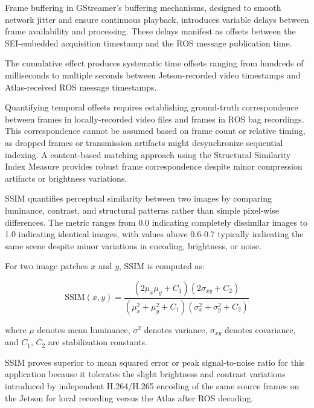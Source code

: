 \documentclass{erauthesis}
\begin{document}
Frame buffering in GStreamer's buffering mechanisms, designed to smooth network jitter and ensure continuous playback, introduces variable delays between frame availability and processing.
These delays manifest as offsets between the SEI-embedded acquisition timestamp and the ROS message publication time.

The cumulative effect produces systematic time offsets ranging from hundreds of milliseconds to multiple seconds between Jetson-recorded video timestamps and Atlas-received ROS message timestamps.


Quantifying temporal offsets requires establishing ground-truth correspondence between frames in locally-recorded video files and frames in ROS bag recordings.
This correspondence cannot be assumed based on frame count or relative timing, as dropped frames or transmission artifacts might desynchronize sequential indexing.
A content-based matching approach using the Structural Similarity Index Measure provides robust frame correspondence despite minor compression artifacts or brightness variations.


SSIM quantifies perceptual similarity between two images by comparing luminance, contrast, and structural patterns rather than simple pixel-wise differences.
The metric ranges from 0.0 indicating completely dissimilar images to 1.0 indicating identical images, with values above 0.6-0.7 typically indicating the same scene despite minor variations in encoding, brightness, or noise.

For two image patches $x$ and $y$, SSIM is computed as:

\begin{equation}
    \text{SSIM}(x,y) = \frac{(2\mu_x\mu_y + C_1)(2\sigma_{xy} + C_2)}{(\mu_x^2 + \mu_y^2 + C_1)(\sigma_x^2 + \sigma_y^2 + C_2)}
\end{equation}


where $\mu$ denotes mean luminance, $\sigma^2$ denotes variance, $\sigma_{xy}$ denotes covariance, and $C_1$, $C_2$ are stabilization constants.

SSIM proves superior to mean squared error or peak signal-to-noise ratio for this application because it tolerates the slight brightness and contrast variations introduced by independent H.264/H.265 encoding of the same source frames on the Jetson for local recording versus the Atlas after ROS decoding.
\end{document}
